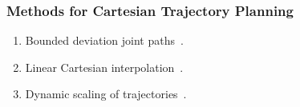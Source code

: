 \documentclass[10pt, aspectratio=169]{beamer}
\theoremstyle{remark}
\theoremstyle{definition}
\begin{document}
\begin{frame}[allowframebreaks]
\frametitle{Methods for Cartesian Trajectory Planning}
\begin{enumerate}
    \item Bounded deviation joint paths~\cite{taylor1979planning}.

    \item Linear Cartesian interpolation~\cite{paul1979manipulator}.

    \item Dynamic scaling of trajectories~\cite{hollerbach1983dynamic}.

\end{enumerate}
\end{frame}
\end{document}
